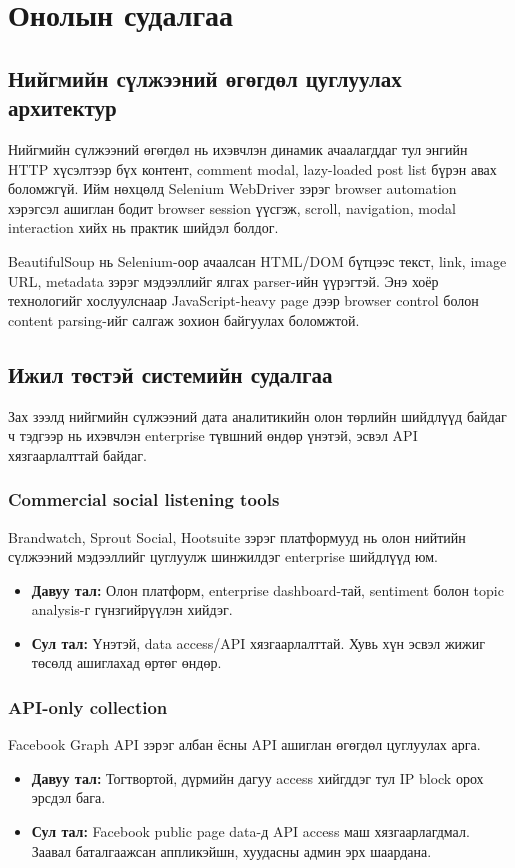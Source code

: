 \chapter{Онолын судалгаа}
\label{Chapter2}

\section{Нийгмийн сүлжээний өгөгдөл цуглуулах архитектур}

Нийгмийн сүлжээний өгөгдөл нь ихэвчлэн динамик ачаалагддаг тул энгийн HTTP хүсэлтээр бүх контент, comment modal, lazy-loaded post list бүрэн авах боломжгүй. Ийм нөхцөлд Selenium WebDriver зэрэг browser automation хэрэгсэл ашиглан бодит browser session үүсгэж, scroll, navigation, modal interaction хийх нь практик шийдэл болдог. 

BeautifulSoup нь Selenium-оор ачаалсан HTML/DOM бүтцээс текст, link, image URL, metadata зэрэг мэдээллийг ялгах parser-ийн үүрэгтэй. Энэ хоёр технологийг хослуулснаар JavaScript-heavy page дээр browser control болон content parsing-ийг салгаж зохион байгуулах боломжтой.

\section{Ижил төстэй системийн судалгаа}

Зах зээлд нийгмийн сүлжээний дата аналитикийн олон төрлийн шийдлүүд байдаг ч тэдгээр нь ихэвчлэн enterprise түвшний өндөр үнэтэй, эсвэл API хязгаарлалттай байдаг.

\subsection{Commercial social listening tools}
Brandwatch, Sprout Social, Hootsuite зэрэг платформууд нь олон нийтийн сүлжээний мэдээллийг цуглуулж шинжилдэг enterprise шийдлүүд юм.
\begin{itemize}
    \item \textbf{Давуу тал:} Олон платформ, enterprise dashboard-тай, sentiment болон topic analysis-г гүнзгийрүүлэн хийдэг.
    \item \textbf{Сул тал:} Үнэтэй, data access/API хязгаарлалттай. Хувь хүн эсвэл жижиг төсөлд ашиглахад өртөг өндөр.
\end{itemize}

\subsection{API-only collection}
Facebook Graph API зэрэг албан ёсны API ашиглан өгөгдөл цуглуулах арга.
\begin{itemize}
    \item \textbf{Давуу тал:} Тогтвортой, дүрмийн дагуу access хийгддэг тул IP block орох эрсдэл бага.
    \item \textbf{Сул тал:} Facebook public page data-д API access маш хязгаарлагдмал. Заавал баталгаажсан аппликэйшн, хуудасны админ эрх шаардана.
\end{itemize}

